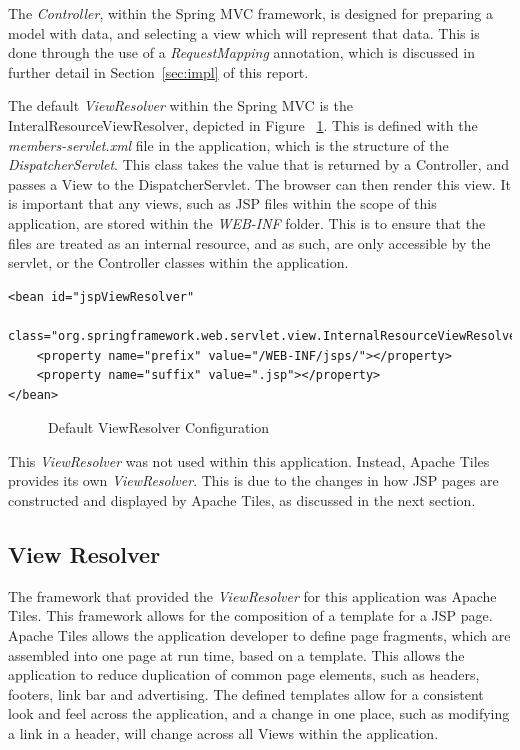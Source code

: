 The \textit{Controller}, within the Spring MVC framework, is designed for preparing a model with data, and selecting a view which will represent that data. This is done through the use of a \textit{RequestMapping} annotation, which is discussed in further detail in Section~\ref{sec:impl} of this report.

The default \textit{ViewResolver} within the Spring MVC is the InteralResourceViewResolver, depicted in Figure ~\ref{fig:defaultViewRes}. This is defined with the \textit{members-servlet.xml} file in the application, which is the structure of the \textit{DispatcherServlet}. This class takes the value that is returned by a Controller, and passes a View to the DispatcherServlet. The browser can then render this view. It is important that any views, such as JSP files within the scope of this application, are stored within the \textit{WEB-INF} folder. This is to ensure that the files are treated as an internal resource, and as such, are only accessible by the servlet, or the Controller classes within the application.

\begin{lstlisting}
<bean id="jspViewResolver"
	class="org.springframework.web.servlet.view.InternalResourceViewResolver">
	<property name="prefix" value="/WEB-INF/jsps/"></property>
	<property name="suffix" value=".jsp"></property>
</bean>
\end{lstlisting}
\begin{figure}[H]
\caption{Default ViewResolver Configuration}
\label{fig:defaultViewRes}
\end{figure}

This \textit{ViewResolver} was not used within this application. Instead, Apache Tiles provides its own \textit{ViewResolver}. This is due to the changes in how JSP pages are constructed and displayed by Apache Tiles, as discussed in the next section.

\subsection{View Resolver}

The framework that provided the \textit{ViewResolver} for this application was Apache Tiles. This framework allows for the composition of a template for a JSP page. Apache Tiles allows the application developer to define page fragments, which are assembled into one page at run time, based on a template. This allows the application to reduce duplication of common page elements, such as headers, footers, link bar and advertising.  The defined templates allow for a consistent look and feel across the application, and a change in one place, such as modifying a link in a header, will change across all Views within the application.

